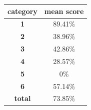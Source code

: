 \documentclass[c]{beamer}
\begin{document}
\begin{frame}
\begin{columns}
\begin{column}{0.5\textwidth}
\begin{overlayarea}{\linewidth}{2cm}
\begin{table}
\begin{center}
\begin{adjustbox}{max width=0.4\textwidth}
{\begin{tabular}{|c|c|}
      \hline
      \textbf{category} & \textbf{mean score}\\
      \hline
      \textbf{1} & 89.41\% \\
      \hline
      \textbf{2} & 38.96\% \\
      \hline
      \textbf{3} & 42.86\% \\
      \hline
      \textbf{4} & 28.57\% \\
      \hline
      \textbf{5} & 0\% \\
      \hline
      \textbf{6} & 57.14\% \\
      \hline
      \textbf{total} & 73.85\% \\
      \hline
    \end{tabular}
    }
    \end{adjustbox}
    \end{center}
  \end{table}
  \end{overlayarea}
\end{column}
\end{columns}
\end{frame}
\end{document}
